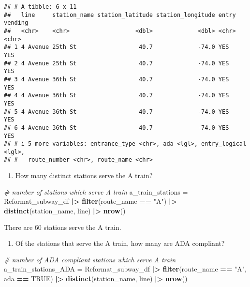 \documentclass[
]{article}
\newenvironment{Shaded}{\begin{snugshade}}{\end{snugshade}}
\newcommand{\CommentTok}[1]{\textcolor[rgb]{0.56,0.35,0.01}{\textit{#1}}}
\newcommand{\ConstantTok}[1]{\textcolor[rgb]{0.56,0.35,0.01}{#1}}
\newcommand{\FunctionTok}[1]{\textcolor[rgb]{0.13,0.29,0.53}{\textbf{#1}}}
\newcommand{\NormalTok}[1]{#1}
\newcommand{\OtherTok}[1]{\textcolor[rgb]{0.56,0.35,0.01}{#1}}
\newcommand{\SpecialCharTok}[1]{\textcolor[rgb]{0.81,0.36,0.00}{\textbf{#1}}}
\newcommand{\StringTok}[1]{\textcolor[rgb]{0.31,0.60,0.02}{#1}}
\providecommand{\tightlist}{%
  \setlength{\itemsep}{0pt}\setlength{\parskip}{0pt}}
\begin{document}
\begin{verbatim}
## # A tibble: 6 x 11
##   line     station_name station_latitude station_longitude entry vending
##   <chr>    <chr>                   <dbl>             <dbl> <chr> <chr>  
## 1 4 Avenue 25th St                  40.7             -74.0 YES   YES    
## 2 4 Avenue 25th St                  40.7             -74.0 YES   YES    
## 3 4 Avenue 36th St                  40.7             -74.0 YES   YES    
## 4 4 Avenue 36th St                  40.7             -74.0 YES   YES    
## 5 4 Avenue 36th St                  40.7             -74.0 YES   YES    
## 6 4 Avenue 36th St                  40.7             -74.0 YES   YES    
## # i 5 more variables: entrance_type <chr>, ada <lgl>, entry_logical <lgl>,
## #   route_number <chr>, route_name <chr>
\end{verbatim}

\begin{enumerate}
\def\labelenumi{\arabic{enumi}.}
\setcounter{enumi}{1}
\tightlist
\item
  How many distinct stations serve the A train?
\end{enumerate}

\begin{Shaded}
\begin{Highlighting}[]
\CommentTok{\# number of stations which serve A train}
\NormalTok{a\_train\_stations }\OtherTok{=}\NormalTok{ Reformat\_subway\_df }\SpecialCharTok{|\textgreater{}}
  \FunctionTok{filter}\NormalTok{(route\_name }\SpecialCharTok{==} \StringTok{"A"}\NormalTok{) }\SpecialCharTok{|\textgreater{}}
  \FunctionTok{distinct}\NormalTok{(station\_name, line) }\SpecialCharTok{|\textgreater{}}
  \FunctionTok{nrow}\NormalTok{()}
\end{Highlighting}
\end{Shaded}

There are 60 stations serve the A train.

\begin{enumerate}
\def\labelenumi{\arabic{enumi}.}
\setcounter{enumi}{2}
\tightlist
\item
  Of the stations that serve the A train, how many are ADA compliant?
\end{enumerate}

\begin{Shaded}
\begin{Highlighting}[]
\CommentTok{\# number of ADA compliant stations which serve A train}
\NormalTok{a\_train\_stations\_ADA }\OtherTok{=}\NormalTok{ Reformat\_subway\_df }\SpecialCharTok{|\textgreater{}}
  \FunctionTok{filter}\NormalTok{(route\_name }\SpecialCharTok{==} \StringTok{"A"}\NormalTok{, ada }\SpecialCharTok{==} \ConstantTok{TRUE}\NormalTok{) }\SpecialCharTok{|\textgreater{}}
  \FunctionTok{distinct}\NormalTok{(station\_name, line) }\SpecialCharTok{|\textgreater{}}
  \FunctionTok{nrow}\NormalTok{()}
\end{Highlighting}
\end{Shaded}
\end{document}
